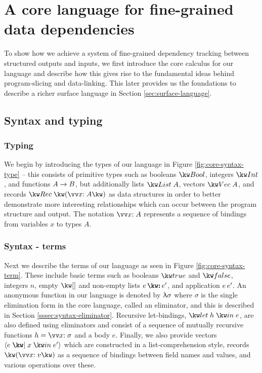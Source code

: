 \newpage

\section{A core language for fine-grained data dependencies}
\label{sec:core-language}

To show how we achieve a system of fine-grained dependency tracking between structured outputs and inputs, we first introduce the core calculus for our language and describe how this gives rise to the fundamental ideas behind program-slicing and data-linking. This later provides us the foundations to describe a richer surface language in Section \ref{sec:surface-language}.

\subsection{Syntax and typing}

\subsubsection{Typing}
We begin by introducing the types of our language in Figure \ref{fig:core-syntax-type} -- this consists of primitive types such as booleans $\tyBool$, integers $\tyInt$, and functions ${A}\rightarrow{B}$, but additionally lists $\tyList{A}$, vectors $\tyVec{A}$, and records $\tyRec{\vec{\bind{x}{A}}}$ as data structures in order to better demonstrate more interesting relationships which can occur between the program structure and output. The notation $\seq{\bind{x}{A}}$  represents a sequence of bindings from variables $x$ to types $A$.



\subsubsection{Syntax - terms}
Next we describe the terms of our language as seen in Figure \ref{fig:core-syntax-term}.  These include basic terms such as booleans $\exTrue$ and $\exFalse$, integers $n$, empty $\exNil$ and non-empty lists $\exCons{e}{e'}$, and application ${e}\,{e'}$. An anonymous function in our language is denoted by $\uplambda{\sigma}$ where $\sigma$ is the single elimination form in the core language, called an eliminator, and this is described in Section \ref{sssec:syntax-eliminator}. Recursive let-bindings, $\exLetRecMutual{h}{e}$, are also defined using eliminators and consist of a sequence of mutually recursive functions $h = \seq{\bind{x}{\sigma}}$ and a body $e$. Finally, we also provide vectors $\exVec{e}{x}{e'}$ which are constructed in a list-comprehension style, records $\exRec{\vec{\bind{x}{v}}}$ as a sequence of bindings between field names and values, and various operations over these. 


